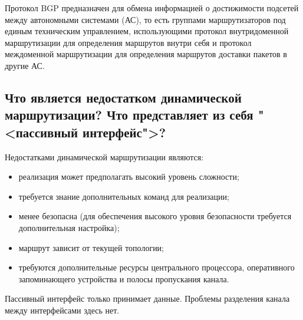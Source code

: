 Протокол BGP предназначен для обмена информацией о достижимости подсетей
между автономными системами (АС), то есть группами маршрутизаторов
под единым техническим управлением, использующими протокол
внутридоменной маршрутизации для определения маршрутов внутри себя
и протокол междоменной маршрутизации для определения маршрутов
доставки пакетов в другие АС.

\subsection{Что является недостатком динамической маршрутизации?
Что представляет из себя "<пассивный интерфейс">?}

Недостатками динамической маршрутизации являются:

\begin{itemize}
    \item реализация может предполагать высокий уровень сложности;
    \item требуется знание дополнительных команд для реализации;
    \item менее безопасна (для обеспечения высокого уровня безопасности
    требуется дополнительная настройка);
    \item маршрут зависит от текущей топологии;
    \item требуются дополнительные ресурсы центрального процессора,
    оперативного запоминающего устройства и полосы пропускания канала.
\end{itemize}

Пассивный интерфейс только принимает данные.
Проблемы разделения канала между интерфейсами здесь нет.